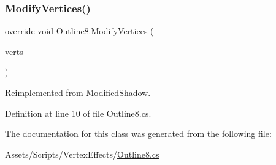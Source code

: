 \subsubsection{\texorpdfstring{Modify\+Vertices()}{ModifyVertices()}}
{\footnotesize\ttfamily override void Outline8.\+Modify\+Vertices (\begin{DoxyParamCaption}\item[{List$<$ U\+I\+Vertex $>$}]{verts }\end{DoxyParamCaption})\hspace{0.3cm}{\ttfamily [virtual]}}



Reimplemented from \mbox{\hyperlink{class_modified_shadow_ac1651effd229c1fd2f454eccc2cf225c}{Modified\+Shadow}}.



Definition at line 10 of file Outline8.\+cs.



The documentation for this class was generated from the following file\+:\begin{DoxyCompactItemize}
\item 
Assets/\+Scripts/\+Vertex\+Effects/\mbox{\hyperlink{_outline8_8cs}{Outline8.\+cs}}\end{DoxyCompactItemize}
